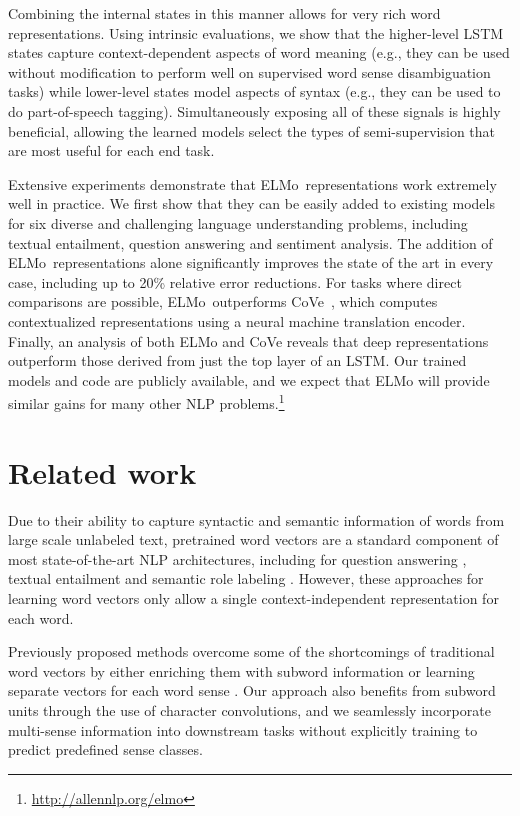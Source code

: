 \documentclass[11pt,a4paper]{article}
\newcommand{\ELMO}{ELMo}
\begin{document}
Combining the internal states in this manner allows for very rich word representations.  Using intrinsic evaluations, we show that the higher-level LSTM states capture context-dependent aspects of word meaning (e.g., they can be used without modification to perform well on supervised word sense disambiguation tasks) while lower-level states model aspects of syntax (e.g., they can be used to do part-of-speech tagging). Simultaneously exposing all of these signals is highly beneficial, allowing the learned models select the types of semi-supervision that are most useful for each end task. 

Extensive experiments demonstrate that \ELMO\ representations work extremely well in practice.
We first show that they can be easily added to existing models for six diverse and challenging language understanding problems, including textual entailment, question answering and sentiment analysis.
The addition of \ELMO\ representations alone significantly improves the state of the art in every case, including up to 20\% relative error reductions.
For tasks where direct comparisons are possible, \ELMO\ outperforms CoVe~\citep{McCann2017LearnedIT}, which computes contextualized representations using a neural machine translation encoder.
Finally, an analysis of both \ELMO{} and CoVe reveals that deep representations outperform those derived from just the top layer of an LSTM.
Our trained models and code are publicly available, and we expect that ELMo will provide similar gains for many other NLP problems.\footnote{\url{http://allennlp.org/elmo}}

\section{Related work}

Due to their ability to capture syntactic and semantic information of words from large scale unlabeled text, pretrained word vectors \citep{Turian2010WordRA,word2vec,Pennington2014GloveGV} are a standard component of most state-of-the-art NLP architectures, including for question answering \citep{liu2017stochastic}, textual entailment \citep{Chen2017EnhancedLF} and semantic role labeling \citep{He2017DeepSR}.
However, these approaches for learning word vectors only allow a single context-independent representation for each word.

Previously proposed methods overcome some of the shortcomings of traditional word vectors by either enriching them with subword information \citep[e.g., ][]{Wieting2016CharagramEW,Bojanowski2017EnrichingWV} or learning separate vectors for each word sense \citep[e.g., ][]{Neelakantan2014EfficientNE}.
Our approach also benefits from subword units through the use of character convolutions, and we seamlessly incorporate multi-sense information into downstream tasks without explicitly training to predict predefined sense classes.
\end{document}
